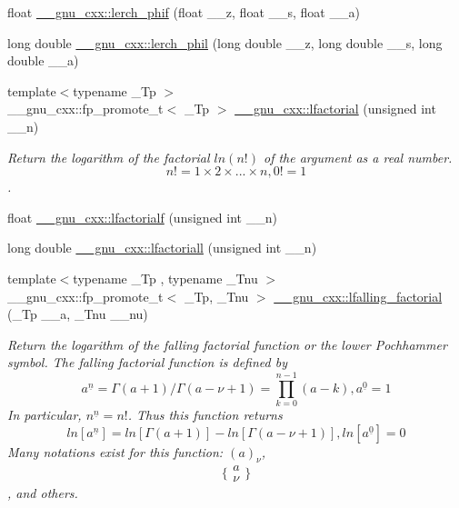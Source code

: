 \begin{DoxyCompactItemize}
\item 
float \hyperlink{group__gnu__math__spec__func_ga90ae3ca570b08b3f458aa83ec2759be3}{\+\_\+\+\_\+gnu\+\_\+cxx\+::lerch\+\_\+phif} (float \+\_\+\+\_\+z, float \+\_\+\+\_\+s, float \+\_\+\+\_\+a)
\item 
long double \hyperlink{group__gnu__math__spec__func_gab975fa919ede92ec176330809c16c8d5}{\+\_\+\+\_\+gnu\+\_\+cxx\+::lerch\+\_\+phil} (long double \+\_\+\+\_\+z, long double \+\_\+\+\_\+s, long double \+\_\+\+\_\+a)
\item 
{\footnotesize template$<$typename \+\_\+\+Tp $>$ }\\\+\_\+\+\_\+gnu\+\_\+cxx\+::fp\+\_\+promote\+\_\+t$<$ \+\_\+\+Tp $>$ \hyperlink{group__gnu__math__spec__func_gab256f8d7b77b9a8fefafca21827166eb}{\+\_\+\+\_\+gnu\+\_\+cxx\+::lfactorial} (unsigned int \+\_\+\+\_\+n)
\begin{DoxyCompactList}\small\item\em Return the logarithm of the factorial $ ln(n!) $ of the argument as a real number. \[ n! = 1 \times 2 \times ... \times n, 0! = 1 \]. \end{DoxyCompactList}\item 
float \hyperlink{group__gnu__math__spec__func_ga65af05c4093d4895a564a8d67e389a9b}{\+\_\+\+\_\+gnu\+\_\+cxx\+::lfactorialf} (unsigned int \+\_\+\+\_\+n)
\item 
long double \hyperlink{group__gnu__math__spec__func_ga3a0c196f34916dc68c29c89f26cbe1ee}{\+\_\+\+\_\+gnu\+\_\+cxx\+::lfactoriall} (unsigned int \+\_\+\+\_\+n)
\item 
{\footnotesize template$<$typename \+\_\+\+Tp , typename \+\_\+\+Tnu $>$ }\\\+\_\+\+\_\+gnu\+\_\+cxx\+::fp\+\_\+promote\+\_\+t$<$ \+\_\+\+Tp, \+\_\+\+Tnu $>$ \hyperlink{group__gnu__math__spec__func_ga2032c10640d5010666d60d9faec86c32}{\+\_\+\+\_\+gnu\+\_\+cxx\+::lfalling\+\_\+factorial} (\+\_\+\+Tp \+\_\+\+\_\+a, \+\_\+\+Tnu \+\_\+\+\_\+nu)
\begin{DoxyCompactList}\small\item\em Return the logarithm of the falling factorial function or the lower Pochhammer symbol. The falling factorial function is defined by \[ a^{\underline{n}} = \Gamma(a + 1) / \Gamma(a - \nu + 1) = \prod_{k=0}^{n-1} (a - k), a^{\underline{0}} = 1 \] In particular, $ n^{\underline{n}} = n! $. Thus this function returns \[ ln[a^{\underline{n}}] = ln[\Gamma(a + 1)] - ln[\Gamma(a - \nu + 1)], ln[a^{\underline{0}}] = 0 \] Many notations exist for this function\+: $ (a)_\nu $, \[ \{ \begin{array}{c} a \\ \nu \end{array} \} \], and others. \end{DoxyCompactList}\item 

\end{DoxyCompactItemize}
